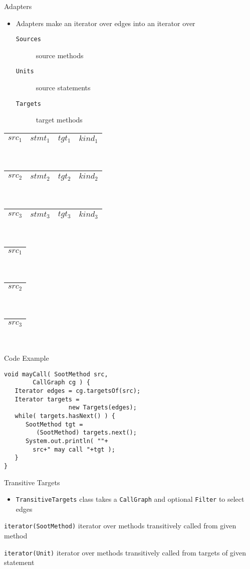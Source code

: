 \begin{slide}{Adapters}
\begin{itemize}
\item Adapters make an iterator over edges into an iterator over
\begin{description}
\item[{\tt Sources}] source methods
\item[{\tt Units}] source statements
\item[{\tt Targets}] target methods
\end{description}
\end{itemize}
\newcommand{\src}[1]{\begin{tabular}{|c|}\hline {\red $src_#1$}\\\hline\end{tabular}}
\newcommand{\edge}[1]{\begin{tabular}{|c|c|c|c|}\hline {\red $src_#1$}&$stmt_#1$&$tgt_#1$&$kind_#1$\\\hline\end{tabular}}
\begin{minipage}{2.5in}
\edge{1}\\
\edge{2}\\
\edge{3}\\
\end{minipage}
\begin{minipage}{1in}
\src{1}\\
\src{2}\\
\src{3}\\
\end{minipage}
\end{slide}

\begin{slide}{Code Example}
\begin{verbatim}
void mayCall( SootMethod src,
        CallGraph cg ) {
   Iterator edges = cg.targetsOf(src);
   Iterator targets =
                  new Targets(edges);
   while( targets.hasNext() ) {
      SootMethod tgt =
         (SootMethod) targets.next();
      System.out.println( ""+
        src+" may call "+tgt );
   }
}
\end{verbatim}
\end{slide}

\begin{slide}{Transitive Targets}
\begin{itemize}
\item {\tt TransitiveTargets} class takes a {\tt CallGraph} and
optional {\tt Filter} to select edges
\end{itemize}
\begin{description}
\item {\tt iterator(SootMethod)} iterator over methods transitively
called from given method
\item {\tt iterator(Unit)} iterator over methods transitively
called from targets of given statement
\end{description}
\end{slide}

